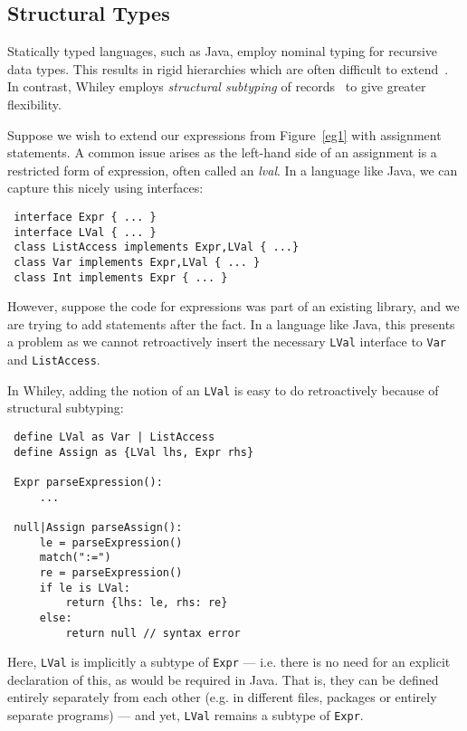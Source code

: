 \subsection{Structural Types}
Statically typed languages, such as Java, employ nominal typing for
recursive data types.  This results in rigid hierarchies which are
often difficult to extend~\cite{MA08}.  In contrast, Whiley employs
{\em structural subtyping} of records~\cite{Card88} to give greater
flexibility.

Suppose we wish to extend our expressions from Figure~\ref{eg1} with
assignment statements.  A common issue arises as the left-hand side of
an assignment is a restricted form of expression, often called an {\em
  lval}.  In a language like Java, we can capture this nicely using
interfaces:
\begin{lstlisting}
 interface Expr { ... }
 interface LVal { ... }
 class ListAccess implements Expr,LVal { ...}
 class Var implements Expr,LVal { ... }
 class Int implements Expr { ... }
\end{lstlisting}
However, suppose the code for expressions was part of an existing
library, and we are trying to add statements after the fact.  In a
language like Java, this presents a problem as we cannot
retroactively insert the necessary \lstinline{LVal} interface to
\lstinline{Var} and \lstinline{ListAccess}.

In Whiley, adding the notion of an \lstinline{LVal} is easy to do
retroactively because of structural subtyping:

\begin{lstlisting}
 define LVal as Var | ListAccess 
 define Assign as {LVal lhs, Expr rhs}
 
 Expr parseExpression():
     ...

 null|Assign parseAssign():
     le = parseExpression()
     match(":=")
     re = parseExpression()
     if le is LVal:
         return {lhs: le, rhs: re}
     else:
         return null // syntax error
\end{lstlisting}
Here, \lstinline{LVal} is implicitly a subtype of \lstinline{Expr} ---
i.e. there is no need for an explicit declaration of this, as would be
required in Java.  That is, they can be defined entirely separately
from each other (e.g. in different files, packages or entirely
separate programs) --- and yet, \lstinline{LVal} remains a subtype of
\lstinline{Expr}.

